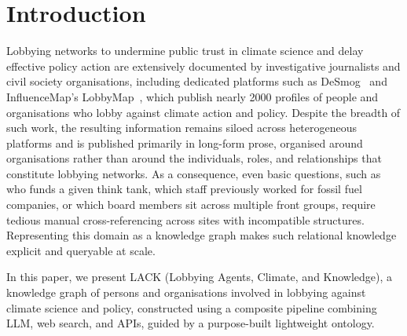 \section{Introduction}
\label{sec:introduction}
Lobbying networks to undermine public trust in climate science and delay effective policy action are extensively documented by investigative journalists and civil society organisations, including dedicated platforms such as DeSmog~\cite{desmog} and InfluenceMap's LobbyMap~\cite{lobbymap}, which publish nearly 2000 profiles of people and organisations who lobby against climate action and policy.
Despite the breadth of such work, the resulting information remains siloed across heterogeneous platforms and is published primarily in long-form prose, organised around organisations rather than around the individuals, roles, and relationships that constitute lobbying networks. 
As a consequence, even basic questions, such as who funds a given think tank, which staff previously worked for fossil fuel companies, or which board members sit across multiple front groups, require tedious manual cross-referencing across sites with incompatible structures. 
Representing this domain as a knowledge graph makes such relational knowledge explicit and queryable at scale.

In this paper, we present LACK (Lobbying Agents, Climate, and Knowledge), a knowledge graph of persons and organisations involved in lobbying against climate science and policy, constructed using a composite pipeline combining LLM, web search, and APIs, guided by a purpose-built lightweight ontology.

